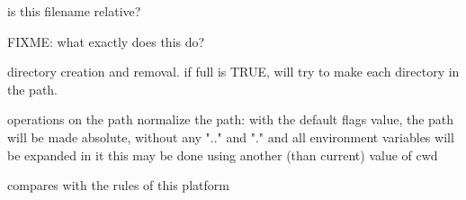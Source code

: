 is this filename relative?


\label{wxfilenameiswild}


FIXME: what exactly does this do?


\label{wxfilenamemkdir}


directory creation and removal.
if full is TRUE, will try to make each directory in the path.


\label{wxfilenamemkdir}



\label{wxfilenamenormalize}


operations on the path
normalize the path: with the default flags value, the path will be
made absolute, without any ".." and "." and all environment
variables will be expanded in it
this may be done using another (than current) value of cwd


\label{wxfilenameprependdir}



\label{wxfilenameremovedir}



\label{wxfilenamermdir}



\label{wxfilenamermdir}



\label{wxfilenamesameas}


compares with the rules of this platform


